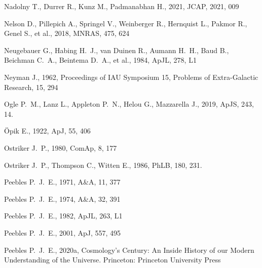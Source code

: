 \documentclass[fleqn,12pt]{article}
\begin{document}
\begin{thebibliography}{}

 Nadolny T., Durrer R., Kunz M., Padmanabhan H., 2021, JCAP, 2021, 009


 Nelson D., Pillepich A., Springel V., Weinberger R., Hernquist L., Pakmor R., Genel S., et al., 2018, MNRAS, 475, 624

 Neugebauer G., Habing H.~J., van Duinen R., Aumann H.~H., Baud B., Beichman C.~A., Beintema D.~A., et al., 1984, ApJL, 278, L1

 Neyman J., 1962, Proceedings of IAU Symposium 15, Problems of Extra-Galactic Research, 15, 294

 Ogle P.~M., Lanz L., Appleton P.~N., Helou G., Mazzarella J., 2019, ApJS, 243, 14. %

 \"Opik E., 1922, ApJ, 55, 406

 Ostriker J.~P., 1980, ComAp, 8, 177

 Ostriker J.~P., Thompson C., Witten E., 1986, PhLB, 180, 231.

 Peebles P.~J.~E., 1971, A\&A, 11, 377

 Peebles P.~J.~E., 1974, A\&A, 32, 391

 Peebles P.~J.~E., 1982, ApJL, 263, L1

 Peebles P.~J.~E., 2001, ApJ, 557, 495

 Peebles P.~J.~E., 2020a, Cosmology's Century: An Inside History of our Modern Understanding of the Universe. Princeton: Princeton University Press


\end{thebibliography}
\end{document}

